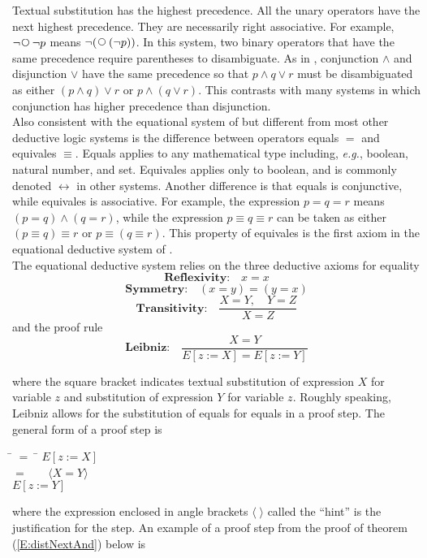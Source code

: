 \documentclass[fleqn, leqno]{article}
\newcommand{\lgap}{2pt} %
\newcommand{\mymathindent}{24pt} %
\newcommand{\Next}{\;\,\text{\raisebox{3.5pt}{\circle{6}}}}
\newcommand{\Gll} {\langle} %
\newcommand{\Ggg} {\rangle} %
\newcommand{\Hint}[1] {\ \ \ $\Gll \mbox{#1} \Ggg$ } %
\begin{document}
Textual substitution has the highest precedence.
All the unary operators have the next highest precedence.
They are necessarily right associative.
For example, $\lnot \Next \lnot p$ means $\lnot (\Next (\lnot p))$.
In this system, two binary operators that have the same precedence require parentheses to disambiguate.
As in \cite{LADM}, conjunction $\land$ and disjunction $\lor$ have the same precedence so that $p\land q\lor r$
must be disambiguated as either $(p\land q)\lor r$ or $p\land (q\lor r)$.
This contrasts with many systems in which conjunction has higher precedence than disjunction.\\

Also consistent with the equational system of \cite{LADM} but different from most other deductive logic systems
is the difference between operators equals $=$ and equivales $\equiv$.
Equals applies to any mathematical type including, {\itshape e.g.\/}, boolean, natural number, and set.
Equivales applies only to boolean, and is commonly denoted $\leftrightarrow$ in other systems.
Another difference is that equals is conjunctive, while equivales is associative.
For example, the expression $p = q = r$ means $(p = q) \land (q = r)$, while the expression $p \equiv q \equiv r$
can be taken as either $(p \equiv q) \equiv r$ or $p \equiv (q \equiv r)$.
This property of equivales is the first axiom in the equational deductive system of \cite{LADM}.
\\


The equational deductive system relies on the three deductive axioms for equality
\[
\textbf{Reflexivity:}\quad x=x
\]
\[
\textbf{Symmetry:}\quad (x=y) = (y=x)
\]
\[
\textbf{Transitivity:}\quad \frac{X=Y, \quad Y=Z}{X=Z}
\]
and the proof rule
\[
\textbf{Leibniz:}\quad \frac{X=Y}{E[z:=X]=E[z:=Y]}
\]

where the square bracket indicates textual substitution of expression $X$ for variable $z$ and substitution
of expression $Y$ for variable $z$.
Roughly speaking, Leibniz allows for the substitution of equals for equals in a proof step.
The general form of a proof step is

\begin{tabbing}
\hspace{\mymathindent} \= $= \;$ \= \kill
\> \> $E[z:=X]$\\[\lgap]
\> $=$ \> \Hint{$X=Y$} \\[\lgap]
\> \> $E[z:=Y]$
\end{tabbing}

where the expression enclosed in angle brackets $\Gll\;\Ggg$ called the ``hint'' is the justification for the step.
An example of a proof step from the proof of theorem (\ref{E:distNextAnd}) below is
\end{document}
